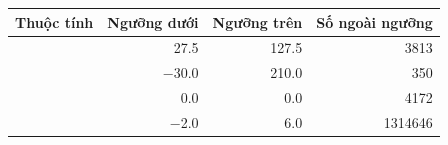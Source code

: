 \begin{tabularx}{\linewidth}{@{}Yrrr@{}}
\toprule
\textbf{Thuộc tính} & \textbf{Ngưỡng dưới} & \textbf{Ngưỡng trên} & \textbf{Số ngoài ngưỡng} \\
\midrule
{} & \num{27.5} & \num{127.5} & \num{3813} \\
 & \num{-30.0} & \num{210.0} & \num{350} \\
 & \num{0.0} & \num{0.0} & \num{4172} \\
 & \num{-2.0} & \num{6.0} & \num{1314646} \\
\bottomrule
\end{tabularx}
